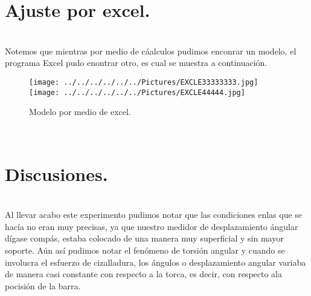 \documentclass[11pt,a4paper]{article}
\begin{document}
\section*{Ajuste por excel.}\\
Notemos que mientras por medio de c\'{a}alculos pudimos enconrar un modelo, el programa Excel pudo enontrar otro, es cual se muestra a continuaci\'{o}n.

\begin{figure}[hbtp]
 \centering
\texttt{[image: ../../../../../../Pictures/EXCLE33333333.jpg]} 
\texttt{[image: ../../../../../../Pictures/EXCLE44444.jpg]} 
 \caption{Modelo por medio de excel. }
\end{figure}
\\
 \section*{Discusiones.}\\
 Al llevar acabo este experimento pudimos notar que las condiciones enlas que se hac\'{i}a no eran muy precisas, ya que nuestro medidor de desplazamiento \'{a}ngular d\'{i}gase comp\'{a}s, estaba colocado de una manera muy superficial y sin mayor soporte. A\'{u}n as\'{i} pudimos notar el fen\'{o}meno de torsi\'{o}n angular y cuando se involucra el esfuerzo de cizalladura, los \'{a}ngulos o desplazamiento angular variaba de manera casi constante con respecto a la torca, es decir, con respecto ala pocisi\'{o}n de la barra.
 
\end{document}
